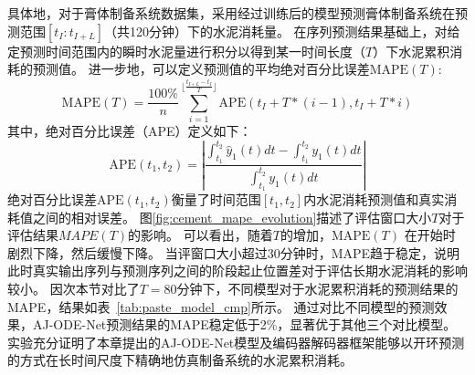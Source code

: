 具体地，对于膏体制备系统数据集，采用经过训练后的模型预测膏体制备系统在预测范围$[{t_I:t_{I+L}}]$（共120分钟）下的水泥消耗量。
在序列预测结果基础上，对给定预测时间范围内的瞬时水泥量进行积分以得到某一时间长度（$T$）下水泥累积消耗的预测值。
进一步地，可以定义预测值的平均绝对百分比误差$\text{MAPE}(T)$:
\begin{equation}
\text{MAPE}(T) = \frac{100\%}{n}\sum\limits_{i=1}^{\lfloor\frac{t_{I+L}-t_I}{T}\rfloor}\text{APE}(t_I+T*(i-1),t_I+T*i)
\label{equ:energy_mape}
\end{equation}
其中，绝对百分比误差（APE）定义如下：
\begin{equation}
\text{APE}(t_1,t_2) = \left|\frac{\int_{t_1}^{t_2}\hat{y}_1(t)dt-\int_{t_1}^{t_2}y_1(t)dt}{\int_{t_1}^{t_2}y_1(t)dt}\right|
\end{equation}
绝对百分比误差$\text{APE}(t_1,t_2)$衡量了时间范围$[t_1, t_2]$内水泥消耗预测值和真实消耗值之间的相对误差。
图\ref{fig:cement_mape_evolution}描述了评估窗口大小$T$对于评估结果$MAPE(T)$的影响。
可以看出，随着$T$的增加，$\text{MAPE}(T)$ 在开始时剧烈下降，然后缓慢下降。
当评窗口大小超过30分钟时，MAPE趋于稳定，说明此时真实输出序列与预测序列之间的阶段起止位置差对于评估长期水泥消耗的影响较小。
因次本节对比了$T=80$分钟下，不同模型对于水泥累积消耗的预测结果的MAPE，结果如表~\ref{tab:paste_model_cmp}所示。
通过对比不同模型的预测效果，AJ-ODE-Net预测结果的MAPE稳定低于2\%，显著优于其他三个对比模型。
实验充分证明了本章提出的AJ-ODE-Net模型及编码器解码器框架能够以开环预测的方式在长时间尺度下精确地仿真制备系统的水泥累积消耗。

